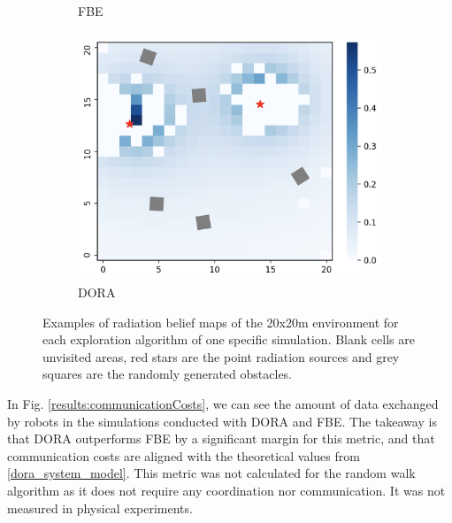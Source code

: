 \begin{figure}
\begin{subfigure}{0.45\textwidth}
        \caption{\ac{FBE}}
        \label{results:belieffrontier}
    \end{subfigure}
    \begin{subfigure}{0.45\textwidth}
        \includegraphics[width=\textwidth]{figures/dora_explorer/heatmap_dora.png}
        \caption{\ac{DORA}}
        \label{results:beliefdora}
    \end{subfigure}
    \caption[DORA radiation belief maps]{Examples of radiation belief maps of the 20x20m environment for each exploration algorithm of one specific simulation. Blank cells are unvisited areas, red stars are the point radiation sources and grey squares are the randomly generated obstacles.}
    \label{results:belief}
\end{figure}

In Fig. \ref{results:communicationCosts}, we can see the amount of data exchanged by robots in the simulations conducted with \ac{DORA} and \ac{FBE}. The takeaway is that \ac{DORA} outperforms \ac{FBE} by a significant margin for this metric, and that communication costs are aligned with the theoretical values from \ref{dora_system_model}. This metric was not calculated for the random walk algorithm as it does not require any coordination nor communication. It was not measured in physical experiments.

